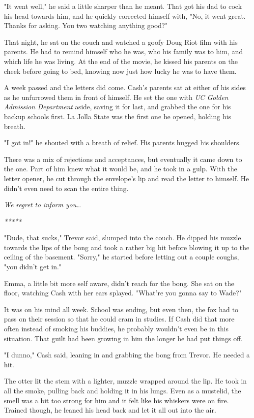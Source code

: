 "It went well," he said a little sharper than he meant. That got his dad to cock his head towards him, and he quickly corrected himself with, "No, it went great. Thanks for asking. You two watching anything good?"

That night, he sat on the couch and watched a goofy Doug Riot film with his parents. He had to remind himself who he was, who his family was to him, and which life he was living. At the end of the movie, he kissed his parents on the cheek before going to bed, knowing now just how lucky he was to have them.

A week passed and the letters did come. Cash's parents sat at either of his sides as he unfurrowed them in front of himself. He set the one with \emph{UC Golden Admission Department} aside, saving it for last, and grabbed the one for his backup schools first. La Jolla State was the first one he opened, holding his breath.

"I got in!" he shouted with a breath of relief. His parents hugged his shoulders.

There was a mix of rejections and acceptances, but eventually it came down to the one. Part of him knew what it would be, and he took in a gulp. With the letter opener, he cut through the envelope's lip and read the letter to himself. He didn't even need to scan the entire thing.

\emph{We regret to inform you\ldots{}}

\emph{*****}

"Dude, that sucks," Trevor said, slumped into the couch. He dipped his muzzle towards the lips of the bong and took a rather big hit before blowing it up to the ceiling of the basement. "Sorry," he started before letting out a couple coughs, "you didn't get in."

Emma, a little bit more self aware, didn't reach for the bong. She sat on the floor, watching Cash with her ears splayed. "What're you gonna say to Wade?"

It was on his mind all week. School was ending, but even then, the fox had to pass on their session so that he could cram in studies. If Cash did that more often instead of smoking his buddies, he probably wouldn't even be in this situation. That guilt had been growing in him the longer he had put things off.

"I dunno," Cash said, leaning in and grabbing the bong from Trevor. He needed a hit.

The otter lit the stem with a lighter, muzzle wrapped around the lip. He took in all the smoke, pulling back and holding it in his lungs. Even as a mustelid, the smell was a bit too strong for him and it felt like his whiskers were on fire. Trained though, he leaned his head back and let it all out into the air.


